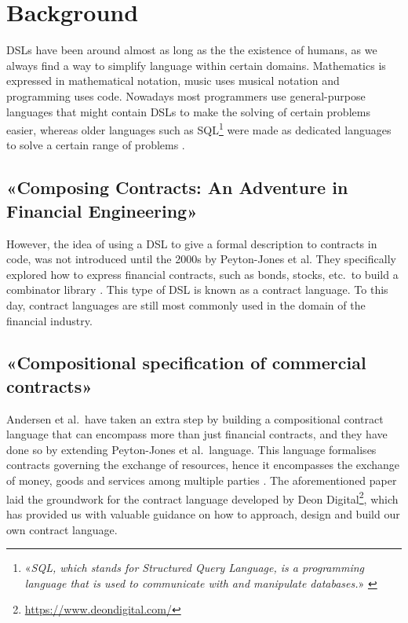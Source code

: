 \documentclass{ituthesis}
\begin{document}
\section{Background}
DSLs have been around almost as long as the the existence of humans, as we always find a way to simplify language within certain domains. Mathematics is expressed in mathematical notation, music uses musical notation and programming uses code. Nowadays most programmers use general-purpose languages that might contain DSLs to make the solving of certain problems easier, whereas older languages such as SQL\footnote{«\textit{SQL, which stands for Structured Query Language, is a programming language that is used to communicate with and manipulate databases.}» \cite{whatisSQL}} were made as dedicated languages to solve a certain range of problems \cite{van2000domain}.

\subsection{«Composing Contracts: An Adventure in Financial Engineering»}
However, the idea of using a DSL to give a formal description to contracts in code, was not introduced until the 2000s by Peyton-Jones et al. They specifically explored how to express financial contracts, such as bonds, stocks, etc.\ to build a combinator library \cite{peyton2000composing}. This type of DSL is known as a contract language. To this day, contract languages are still most commonly used in the domain of the financial industry.

\subsection{«Compositional specification of commercial contracts»}
Andersen et al.\ have taken an extra step by building a compositional contract language that can encompass more than just financial contracts, and they have done so by extending Peyton-Jones et al.\ language. This language formalises contracts governing the exchange of resources, hence it encompasses the exchange of money, goods and services among multiple parties \cite{andersen2006compositional}. The aforementioned paper laid the groundwork for the contract language developed by Deon Digital\footnote{\url{https://www.deondigital.com/}}, which has provided us with valuable guidance on how to approach, design and build our own contract language.
\end{document}
